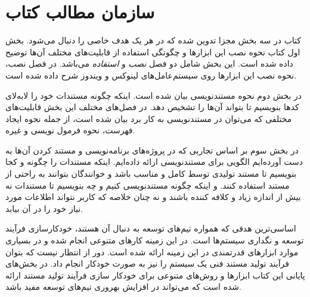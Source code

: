 %
% 
% 
% 
%
\section{سازمان مطالب کتاب} 

کتاب در سه بخش مجزا تدوین شده که در هر یک هدف خاصی را دنبال می‌شود.
بخش اول کتاب نحوه نصب این ابزارها و چگونگی استفاده از قابلیت‌های مختلف آن‌ها
توضیح داده شده است.
این بخش شامل دو فصل \emph{نصب} و \emph{استفاده} می‌باشد. در فصل نصب، نحوه نصب
این ابزارها روی  سیستم‌عامل‌های لینوکس و ویندوز شرح داده شده است.

در بخش دوم نحوه مستندنویسی بیان شده است. اینکه چگونه مستندات خود را لابه‌لای
کدها بنویسیم تا  بتواند آن‌ها را تشخیص دهد. در فصل‌های مختلف این بخش
قابلیت‌های مختلفی که می‌توان در مستندنویسی به کار برد بیان شده است، از جمله نحوه
ایجاد فهرست، نحوه فرمول نویسی و غیره.

در بخش سوم بر اساس تجاربی که در پروژه‌های برنامه‌نویسی و مستند کردن آن‌ها به دست
آورده‌ایم الگویی برای مستندنویسی ارائه داده‌ایم. اینکه مستندات را چگونه و کجا
بنویسیم تا مستند تولیدی توسط  کامل و مناسب باشد و خوانندگان بتوانند
به راحتی از مستند استفاده کنند. و اینکه چگونه مستندنویسی کنیم و چه بنویسیم تا
مستندات نه بیش از اندازه زیاد و کلافه کننده باشند و نه چنان خلاصه که کاربر
نتواند اطلاعات مورد نیاز خود را در آن بیابد.

اساسی‌ترین هدفی که همواره تیم‌های توسعه به دنبال آن هستند، خودکارسازی فرآیند
توسعه و نگداری سیستم‌ها است. در این زمینه کارهای متنوعی انجام شده و در بسیاری
موارد ابزارهای قدرتمندی در این زمینه ارائه شده است. دور از انتظار نیست که بتوان
فرآیند تولید مستند فنی یک سیستم را نیز به صورت خودکار انجام داد. در بخش‌های
پایانی این کتاب ابزارها و روش‌های متنوعی برای خودکار سازی فرآیند تولید مستند
ارائه شده است که می‌تواند در افزایش بهروری تیم‌های توسعه مفید باشد.


